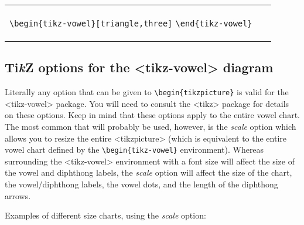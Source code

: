 \documentclass{article}
\newcommand{\pkg}[1]{\texttt{#1}}
\newcommand{\TikZ}{Ti\textit{k}Z\xspace}
\def\\{}%
\def\texttt#1{<#1>}%
\begin{document}
\begin{center}
\begin{tabular}{ll}
  \begin{minipage}[t]{6.5cm}{\small
    \verb|\begin{tikz-vowel}[triangle,three]|\\
    \verb|\end{tikz-vowel}|\\}
  \end{minipage} & 
  \begin{minipage}[t]{6.5cm}
  {~}
  \end{minipage} \\
  \begin{minipage}[t]{6.5cm}{
  \begin{tikz-vowel}\end{tikz-vowel} \\}\end{minipage} &
\end{tabular}
\end{center}

\subsection{\TikZ options for the \pkg{tikz-vowel} diagram}
\label{sec:TikZ options for the tikz-vowel diagram}

Literally any option that can be given to \verb|\begin{tikzpicture}| is valid for the \pkg{tikz-vowel} package.  You will need to consult the \pkg{tikz} package for details on these options.  Keep in mind that these options apply to the entire vowel chart.  The most common that will probably be used, however, is the \textit{scale} option which allows you to resize the entire \texttt{tikzpicture} (which is equivalent to the entire vowel chart defined by the \verb+\begin{tikz-vowel}+ environment).  Whereas surrounding the \texttt{tikz-vowel} environment with a font size will affect the size of the vowel and diphthong labels, the \textit{scale} option will affect the size of the chart, the vowel/diphthong labels, the vowel dots, and the length of the diphthong arrows.

\bigskip
\noindent
Examples of different size charts, using the \textit{scale} option:
\end{document}
